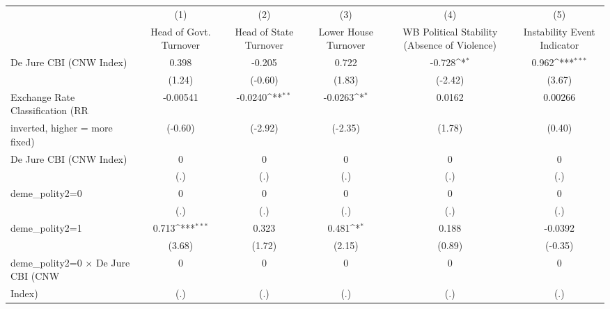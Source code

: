 {
\def\sym#1{\ifmmode^{#1}\else\(^{#1}\)\fi}
\begin{tabular}{l*{5}{c}}
\toprule
                                        &\multicolumn{1}{c}{(1)}&\multicolumn{1}{c}{(2)}&\multicolumn{1}{c}{(3)}&\multicolumn{1}{c}{(4)}&\multicolumn{1}{c}{(5)}\\
                                        &\multicolumn{1}{c}{Head of Govt. Turnover}&\multicolumn{1}{c}{Head of State Turnover}&\multicolumn{1}{c}{Lower House Turnover}&\multicolumn{1}{c}{WB Political Stability (Absence of Violence)}&\multicolumn{1}{c}{Instability Event Indicator}\\
\midrule
De Jure CBI (CNW Index)                 &0.398         &-0.205         &0.722         &-0.728\sym{*}  &0.962\sym{***}\\
                                        &(1.24)         &(-0.60)         &(1.83)         &(-2.42)         &(3.67)         \\
\addlinespace
Exchange Rate Classification (RR        &-0.00541         &-0.0240\sym{**} &-0.0263\sym{*}  &0.0162         &0.00266         \\
inverted, higher = more fixed)          &(-0.60)         &(-2.92)         &(-2.35)         &(1.78)         &(0.40)         \\
\addlinespace
De Jure CBI (CNW Index)                 &    0         &    0         &    0         &    0         &    0         \\
                                        &  (.)         &  (.)         &  (.)         &  (.)         &  (.)         \\
\addlinespace
deme\_polity2=0                          &    0         &    0         &    0         &    0         &    0         \\
                                        &  (.)         &  (.)         &  (.)         &  (.)         &  (.)         \\
\addlinespace
deme\_polity2=1                          &0.713\sym{***}&0.323         &0.481\sym{*}  &0.188         &-0.0392         \\
                                        &(3.68)         &(1.72)         &(2.15)         &(0.89)         &(-0.35)         \\
\addlinespace
deme\_polity2=0 $\times$ De Jure CBI (CNW&    0         &    0         &    0         &    0         &    0         \\
Index)                                  &  (.)         &  (.)         &  (.)         &  (.)         &  (.)         \\

\end{tabular}}
